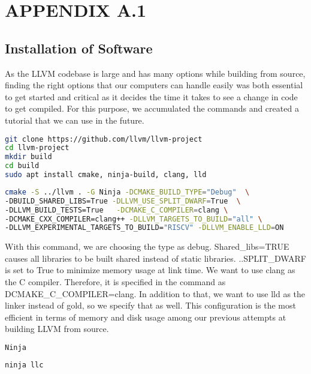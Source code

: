 \chapter{APPENDIX A.1}
\renewcommand{\theequation}{A.1.\arabic{equation}}
\setcounter{equation}{0}
\section{Installation of Software}

As the LLVM codebase is large and has many options while building from source, finding the right options that our computers can handle easily was both essential to get started and critical as it decides the time it takes to see a change in code to get compiled. For this purpose, we accumulated the commands and created a tutorial that we can use in the future.

\begin{lstlisting}[language=Bash, caption={Clone Repository and Install Necessary Packages}]
git clone https://github.com/llvm/llvm-project
cd llvm-project
mkdir build
cd build	
sudo apt install cmake, ninja-build, clang, lld	
\end{lstlisting}

\begin{lstlisting}[language=Bash, caption={CMake Configuration We Used}]
cmake -S ../llvm . -G Ninja -DCMAKE_BUILD_TYPE="Debug"  \
-DBUILD_SHARED_LIBS=True -DLLVM_USE_SPLIT_DWARF=True  \
-DLLVM_BUILD_TESTS=True   -DCMAKE_C_COMPILER=clang \
-DCMAKE_CXX_COMPILER=clang++ -DLLVM_TARGETS_TO_BUILD="all" \
-DLLVM_EXPERIMENTAL_TARGETS_TO_BUILD="RISCV" -DLLVM_ENABLE_LLD=ON	
\end{lstlisting}
With this command, we are choosing the type as debug. Shared\_libs=TRUE causes all libraries to be built shared instead of static libraries. ..SPLIT\_DWARF is set to True to minimize memory usage at link time. We want to use clang as the C compiler. Therefore, it is specified in the command as DCMAKE\_C\_COMPILER=clang. In addition to that, we want to use lld as the linker instead of gold, so we specify that as well.
This configuration is the most efficient in terms of memory and disk usage among our previous attempts at building LLVM from source.
\noindent
\begin{minipage}[t]{0.35\linewidth}
\begin{lstlisting}[language=Bash, caption={To build from scratch or to rebuild files with change, automatically}]
Ninja
\end{lstlisting}
\end{minipage}
\begin{minipage}[t]{0.25\linewidth}
\hfill
\end{minipage}
\begin{minipage}[t]{0.35\linewidth}
\begin{lstlisting}[language=Bash, caption={To build llc only which is the binary we modify}]
ninja llc	
\end{lstlisting}
\end{minipage}



